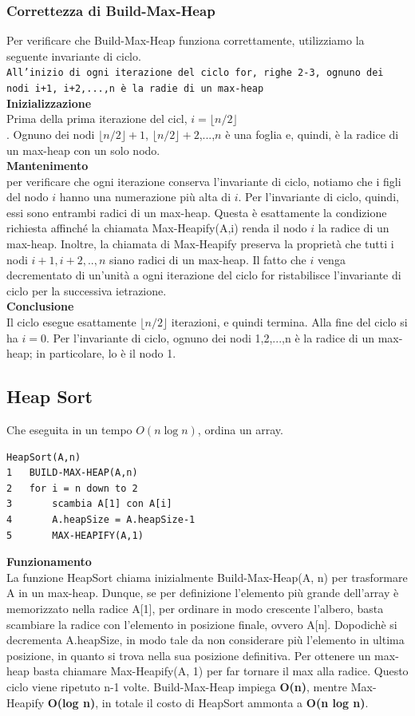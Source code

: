 \subsubsection{Correttezza di Build-Max-Heap}
Per verificare che Build-Max-Heap funziona correttamente, utilizziamo la seguente invariante di ciclo.\\
\texttt{All'inizio di ogni iterazione del ciclo for, righe 2-3, ognuno dei nodi i+1, i+2,...,n è la radie di un max-heap}\\
\textbf{Inizializzazione}\\
Prima della prima iterazione del cicl, $i =\lfloor n/2 \rfloor$\\. Ognuno dei nodi $\lfloor n/2 \rfloor + 1$, $\lfloor n/2 \rfloor + 2$,...,$n$ è una foglia e, quindi, è la radice di un max-heap con un solo nodo. \\
\textbf{Mantenimento}\\
per verificare che ogni iterazione conserva l'invariante di ciclo, notiamo che i figli del nodo $i$ hanno una numerazione più alta di $i$. Per l'invariante di ciclo, quindi, essi sono entrambi radici di un max-heap. Questa è esattamente la condizione richiesta affinché la chiamata Max-Heapify(A,i) renda il nodo $i$ la radice di un max-heap. Inoltre, la chiamata di Max-Heapify preserva la proprietà che tutti i nodi $i+1,i+2,..,n$ siano radici di un max-heap. Il fatto che $i$ venga decrementato di un'unità a ogni iterazione del ciclo for ristabilisce l'invariante di ciclo per la successiva ietrazione. \\
\textbf{Conclusione}\\
Il ciclo esegue esattamente $\lfloor n/2 \rfloor$ iterazioni, e quindi termina. Alla fine del ciclo si ha $i=0$. Per l'invariante di ciclo, ognuno dei nodi 1,2,...,n è la radice di un max-heap; in particolare, lo è il nodo 1.
\subsection{Heap Sort}
Che eseguita in un tempo $O(n \log n)$, ordina un array.
\begin{verbatim}
HeapSort(A,n)
1   BUILD-MAX-HEAP(A,n)
2   for i = n down to 2
3       scambia A[1] con A[i]
4       A.heapSize = A.heapSize-1
5       MAX-HEAPIFY(A,1)
\end{verbatim}
\noindent \textbf{Funzionamento}\\
La funzione HeapSort chiama inizialmente Build-Max-Heap(A, n) per trasformare A in un max-heap. Dunque, se per definizione l’elemento più grande dell’array è memorizzato nella radice A[1], per ordinare in modo crescente l’albero, basta scambiare la radice con l’elemento in posizione finale, ovvero A[n]. Dopodichè si decrementa A.heapSize, in modo tale da non considerare più l’elemento in ultima posizione, in quanto si trova nella sua posizione definitiva. Per ottenere un max-heap basta chiamare Max-Heapify(A, 1) per far tornare il max alla radice. Questo ciclo viene ripetuto n-1 volte. Build-Max-Heap impiega \textbf{O(n)}, mentre
Max-Heapify \textbf{O(log n)}, in totale il costo di HeapSort ammonta a \textbf{O(n log n)}.